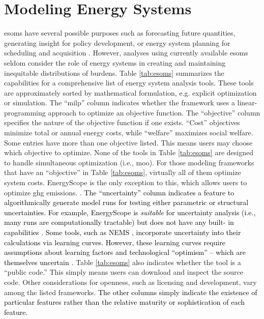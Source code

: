 \section{Modeling Energy Systems}

\Acp{esom} have several possible
purposes such as forecasting future quantities, generating insight for policy
development, or energy system planning for scheduling and acquisition
\cite{decarolis_using_2011, yue_review_2018}. However, analyses using currently 
available \acp{esom} seldom consider the role of energy systems in creating and
maintaining inequitable distributions of burdens. Table \ref{tab:esoms} summarizes
the capabilities for a comprehensive list of energy system analysis tools. These
tools are approximately sorted by mathematical formulation, e.g. explicit
optimization or simulation. The ``\ac{milp}'' column indicates whether the
framework uses a linear-programming approach to optimize an objective function.
The ``objective'' column specifies the nature of the objective function if one
exists. ``Cost'' objectives minimize total or annual energy costs, while
``welfare'' maximizes social welfare. Some entries have more than one objective
listed. This means users may choose which objective to optimize. None of the
tools in Table \ref{tab:esoms} are designed to handle simultaneous optimization
(i.e., \ac{moo}). For those modeling frameworks that have an ``objective'' in
Table \ref{tab:esoms}, virtually all of them optimize system costs. EnergyScope
is the only exception to this, which allows users to optimize \ac{ghg}
emissions. \cite{limpens_energyscope_2019}. \textcolor{black}{The
``uncertainty'' column indicates a feature to algorithmically generate model
runs for testing either parametric or structural uncertainties.
\textcolor{black}{For example, EnergyScope is \textit{suitable} for uncertainty
analysis (i.e., many runs are computationally tractable) but does not have any
built- in capabilities \cite{limpens_energyscope_2019}.} Some tools, such as
NEMS \cite{nalley_national_2019}, incorporate uncertainty into their
calculations via learning curves. However, these learning curves require
assumptions about learning factors and technological ``optimism'' --  which are
themselves uncertain \cite{nalley_national_2019}.} Table \ref{tab:esoms} also
indicates whether the tool is a ``public code.'' This simply means users can
download and inspect the source code. Other considerations for openness, such as
licensing and development, vary among the listed frameworks.
\textcolor{black}{The other columns simply indicate the existence of particular
features rather than the relative maturity or sophistication of each feature.} 

